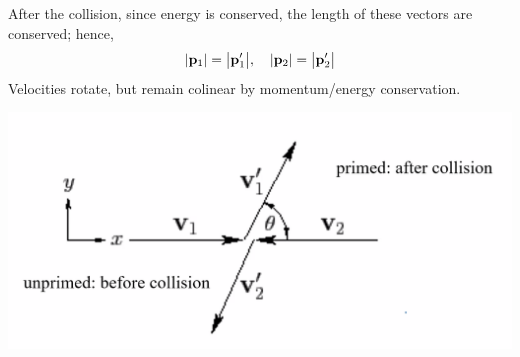 \begin{s}
After the collision, since energy is conserved, the length of these vectors are conserved; hence,
\[\abs{\mathbf{p}_1} = \abs{\mathbf{p}'_1}, \quad \abs{\mathbf{p}_2} = \abs{\mathbf{p}'_2}\]
Velocities rotate, but remain colinear by momentum/energy conservation.
\begin{center}
    \includegraphics[scale=0.5]{Lecture-29/l29-img2.png}
\end{center}
\end{s}

